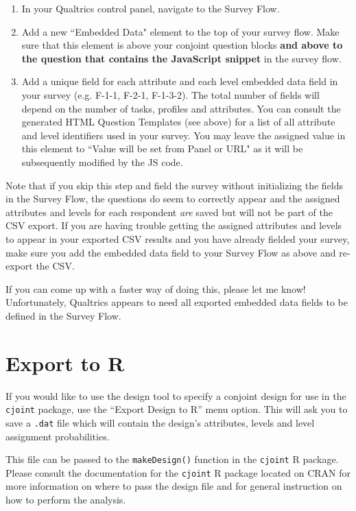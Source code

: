 \documentclass[12pt]{article}
\begin{document}
\begin{enumerate}
\item In your Qualtrics control panel, navigate to the Survey Flow.
\item Add a new ``Embedded Data" element to the top of your survey flow. Make sure that this element is above your conjoint question blocks \textbf{and above to the question that contains the JavaScript snippet} in the survey flow.
\item Add a unique field for each attribute and each level embedded data field in your survey (e.g. F-1-1, F-2-1, F-1-3-2). The total number of fields will depend on the number of tasks, profiles and attributes. You can consult the generated HTML Question Templates (see above) for a list of all attribute and level identifiers used in your survey. You may leave the assigned value in this element to ``Value will be set from Panel or URL" as it will be subsequently modified by the JS code.
\end{enumerate}

Note that if you skip this step and field the survey without initializing the fields in the Survey Flow, the questions do seem to correctly appear and the assigned attributes and levels for each respondent \textit{are} saved but will not be part of the CSV export. If you are having trouble getting the assigned attributes and levels to appear in your exported CSV results and you have already fielded your survey, make sure you add the embedded data field to your Survey Flow as above and re-export the CSV.

If you can come up with a faster way of doing this, please let me know! Unfortunately, Qualtrics appears to need all exported embedded data fields to be defined in the Survey Flow.

\section{Export to R}

If you would like to use the design tool to specify a conjoint design for use in the \texttt{cjoint} package, use the ``Export Design to R'' menu option. This will ask you to save a \texttt{.dat} file which will contain the design's attributes, levels and level assignment probabilities. 

This file can be passed to the \texttt{makeDesign()} function in the \texttt{cjoint} R package. Please consult the documentation for the \texttt{cjoint} R package located on CRAN for more information on where to pass the design file and for general instruction on how to perform the analysis.
\end{document}
